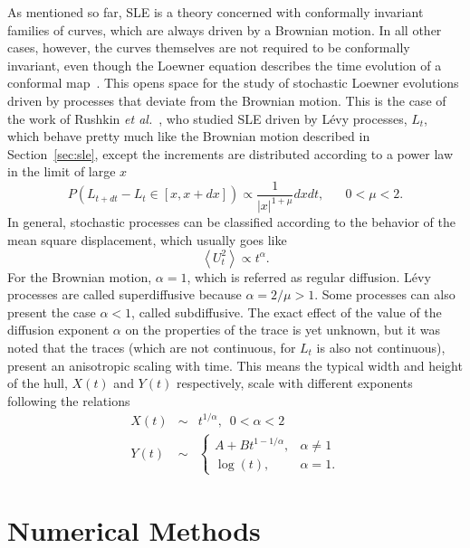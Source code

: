 As mentioned so far, SLE is a theory concerned with conformally invariant
families of curves, which are always driven by a Brownian motion. In all other
cases, however, the curves themselves are not required to be conformally
invariant, even though the Loewner equation describes the time evolution of a
conformal map~\cite{Henkel2012}. This opens space for the study of stochastic
Loewner evolutions driven by processes that deviate from the Brownian motion.
This is the case of the work of Rushkin \textit{et al.}~\cite{Rushkin2006,
Oikonomou2008}, who studied SLE driven by L\'evy processes, $L_t$,
which behave pretty much like the Brownian motion described in
Section~\ref{sec:sle}, except the increments are distributed according to a
power law in the limit of large $x$
\begin{equation}
    P(L_{t+dt} - L_t \in [x, x+dx]) \propto \frac{1}{|x|^{1+\mu}}dxdt,
    \,\,\,\,\,\,\,\,\,\,
    0<\mu<2.
\end{equation}
In general, stochastic processes can be classified according 
to the behavior of the mean square displacement, which usually goes like
\begin{equation}
    \left\langle U_{t}^{2}\right\rangle \propto t^{\alpha}.
\end{equation}
For the Brownian motion, $\alpha=1$, which is referred as regular diffusion.
L\'evy processes are called superdiffusive because $\alpha=2/\mu>1$. Some
processes can also present the case $\alpha<1$, called subdiffusive. The exact
effect of the value of the diffusion exponent $\alpha$ on the properties of the
trace is yet unknown, but it was noted that the traces (which are not
continuous, for $L_t$ is also not continuous), present an anisotropic scaling
with time. This means the typical width and height of the hull, $X(t)$ and $Y(t)$
respectively, scale with different exponents following the relations
\begin{eqnarray}
    \label{eq:aniscale}
    X\left(t\right) & \sim & t^{1/\alpha},\,\,\,0<\alpha<2\\
    Y\left(t\right) & \sim & \begin{cases}
    A+Bt^{1-1/\alpha}, & \alpha\neq1\\
    \log\left(t\right), & \alpha=1.
    \end{cases}
\end{eqnarray}


\section{Numerical Methods}
\label{sec:num}

